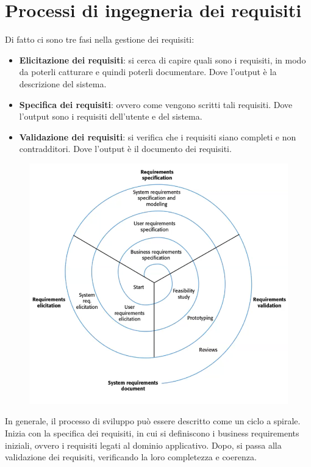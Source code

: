 \section{Processi di ingegneria dei requisiti}
Di fatto ci sono tre fasi nella gestione dei requisiti:
\begin{itemize}
    \item \textbf{Elicitazione dei requisiti}: si cerca di capire quali sono i requisiti,
    in modo da poterli catturare e quindi poterli documentare. Dove l'output è la 
    descrizione del sistema.
    \item \textbf{Specifica dei requisiti}: ovvero come vengono scritti tali requisiti.
    Dove l'output sono i requisiti dell'utente e del sistema.
    \item \textbf{Validazione dei requisiti}: si verifica che i requisiti siano completi e 
    non contradditori. Dove l'output è il documento dei requisiti.
\end{itemize}
\begin{figure}[H]
    \centering
    \includegraphics[scale=0.4]{img/requisitispirale.png}
\end{figure}
In generale, il processo di sviluppo può essere descritto come un ciclo a spirale.
Inizia con la specifica dei
requisiti, in cui si definiscono i business requirements iniziali, ovvero i
requisiti legati al dominio applicativo. Dopo, si passa alla validazione dei
requisiti, verificando la loro completezza e coerenza.


